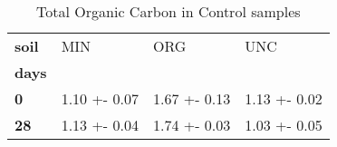 \begin{table}
\centering
\caption{Total Organic Carbon in Control samples}
\label{<built-in method lower of str object at 0x7f389ecd0928>_treated_main}
\begin{tabular}{llll}
\toprule
\textbf{soil} &           MIN &           ORG &           UNC \\
\textbf{days} &               &               &               \\
\midrule
\textbf{0   } &  1.10 +- 0.07 &  1.67 +- 0.13 &  1.13 +- 0.02 \\
\textbf{28  } &  1.13 +- 0.04 &  1.74 +- 0.03 &  1.03 +- 0.05 \\
\bottomrule
\end{tabular}
\end{table}
